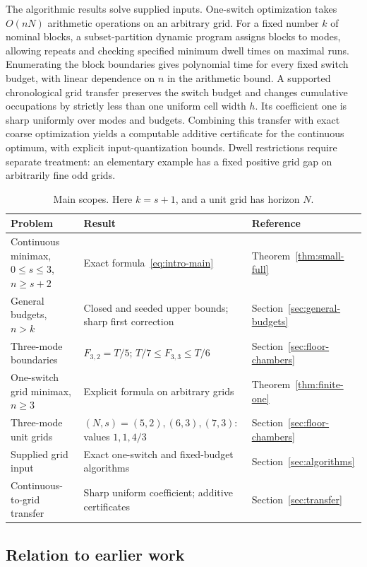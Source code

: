 The algorithmic results solve supplied inputs. One-switch optimization takes
$O(nN)$ arithmetic operations on an arbitrary grid. For a fixed number $k$
of nominal blocks, a subset-partition dynamic program assigns blocks to
modes, allowing repeats and checking specified minimum dwell times on maximal
runs. Enumerating the block boundaries gives polynomial time for every fixed
switch budget, with linear dependence on $n$ in the arithmetic bound.
A supported chronological grid transfer preserves the switch budget and
changes cumulative occupations by strictly less than one uniform cell width
$h$. Its coefficient one is sharp uniformly over modes and budgets. Combining
this transfer with exact coarse optimization yields a computable additive
certificate for the continuous optimum, with explicit input-quantization
bounds. Dwell restrictions require separate treatment: an elementary example
has a fixed positive grid gap on arbitrarily fine odd grids.

\begin{table}[tb]
\centering\small
\caption{Main scopes. Here $k=s+1$, and a unit grid has horizon $N$.}
\label{tab:results-synopsis}
\begin{tabular}{@{}p{.32\linewidth}p{.43\linewidth}p{.18\linewidth}@{}}
\toprule
Problem & Result & Reference\\
\midrule
Continuous minimax, $0\le s\le3$, $n\ge s+2$
 & Exact formula~\eqref{eq:intro-main} & Theorem~\ref{thm:small-full}\\
General budgets, $n>k$ & Closed and seeded upper bounds; sharp first correction
 & Section~\ref{sec:general-budgets}\\
Three-mode boundaries & $F_{3,2}=T/5$; $T/7\le F_{3,3}\le T/6$
 & Section~\ref{sec:floor-chambers}\\
One-switch grid minimax, $n\ge3$ & Explicit formula on arbitrary grids
 & Theorem~\ref{thm:finite-one}\\
Three-mode unit grids & $(N,s)=(5,2),(6,3),(7,3)$: values $1,1,4/3$
 & Section~\ref{sec:floor-chambers}\\
Supplied grid input & Exact one-switch and fixed-budget algorithms
 & Section~\ref{sec:algorithms}\\
Continuous-to-grid transfer & Sharp uniform coefficient; additive certificates
 & Section~\ref{sec:transfer}\\
\bottomrule
\end{tabular}
\end{table}

\subsection{Relation to earlier work}

